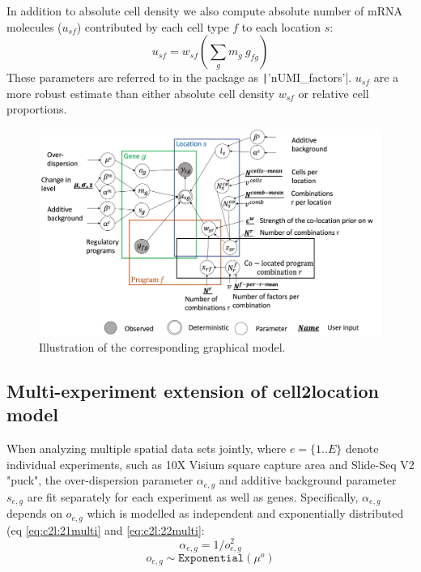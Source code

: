 \documentclass[11pt,a4paper]{article}
\begin{document}
In addition to absolute cell density we also compute absolute number of mRNA molecules ($u_{sf}$) contributed by each cell type $f$ to each location $s$:
\begin{equation} \label{eq:c2l:24}
u_{sf} = w_{sf} (\sum_{g} {m_{g} \: g_{fg}})
\end{equation}
These parameters are referred to in the package as \texttt|'nUMI_factors'|. $u_{sf}$ are a more robust estimate than either absolute cell density $w_{sf}$ or relative cell proportions. \newline

\begin{figure}
    \includegraphics[scale=0.35]{images/CoLocationModelNB4V2.png}
    \caption{Illustration of the corresponding graphical model.}
    \label{fig:graphical_model}
\end{figure}

\subsection{Multi-experiment extension of cell2location model} \label{c2l_multi}

When analyzing multiple spatial data sets jointly, where $e=\{1..E\}$ denote individual experiments, such as 10X Visium square capture area and Slide-Seq V2 "puck", the over-dispersion parameter $\alpha_{e,g}$ and additive background parameter $s_{e,g}$ are fit separately for each experiment as well as genes. Specifically, $\alpha_{e,g}$ depends on $o_{e,g}$ which is modelled as independent and exponentially distributed (eq \ref{eq:c2l:21multi} and \ref{eq:c2l:22multi}:
    \begin{equation} \label{eq:c2l:21multi}
    \alpha_{e,g} = 1 / o_{e,g} ^ 2
    \end{equation}
    \begin{equation} \label{eq:c2l:22multi}
    o_{e,g} \sim \mathtt{Exponential}(\mu^o)
    \end{equation}
\end{document}
